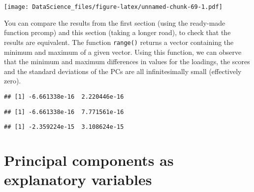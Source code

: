 \documentclass[
]{book}
\newenvironment{Shaded}{\begin{snugshade}}{\end{snugshade}}
\newcommand{\FunctionTok}[1]{\textcolor[rgb]{0.00,0.00,0.00}{#1}}
\newcommand{\NormalTok}[1]{#1}
\newcommand{\SpecialCharTok}[1]{\textcolor[rgb]{0.00,0.00,0.00}{#1}}
\begin{document}
\texttt{[image: DataScience\_files/figure-latex/unnamed-chunk-69-1.pdf]}

You can compare the results from the first section (using the ready-made function prcomp) and this section (taking a longer road), to check that the results are equivalent. The function \texttt{range()} returns a vector containing the minimum and maximum of a given vector. Using this function, we can observe that the minimum and maximum differences in values for the loadings, the scores and the standard deviations of the PCs are all infinitesimally small (effectively zero).

\begin{Shaded}
\end{Shaded}

\begin{verbatim}
## [1] -6.661338e-16  2.220446e-16
\end{verbatim}

\begin{Shaded}
\end{Shaded}

\begin{verbatim}
## [1] -6.661338e-16  7.771561e-16
\end{verbatim}

\begin{Shaded}
\end{Shaded}

\begin{verbatim}
## [1] -2.359224e-15  3.108624e-15
\end{verbatim}

\hypertarget{principal-components-as-explanatory-variables}{%
\section{Principal components as explanatory variables}\label{principal-components-as-explanatory-variables}}
\end{document}
